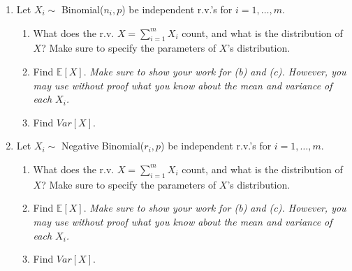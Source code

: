 \documentclass[12pt]{article}
\begin{document}
\begin{enumerate}
\item \label{SumBinom} Let $X_i\sim$ Binomial($n_i,p$) be independent r.v.'s for $i=1,\ldots,m$. 
	\begin{enumerate}
	\item What does the r.v. $X=\sum_{i=1}^mX_i$ count, and what is the distribution of $X$? Make sure to specify the parameters of $X$'s distribution.
	\item Find $\mathbb{E}[X]$. \emph{Make sure to show your work for (b) and (c). However, you may use without proof what you know about the mean and variance of each $X_i$.}
	\item Find $Var[X]$.
	\end{enumerate}





\item \label{SumNegBinom} Let $X_i\sim$ Negative Binomial($r_i,p$) be independent r.v.'s for $i=1,\ldots,m$. 
	\begin{enumerate}
	\item What does the r.v. $X=\sum_{i=1}^mX_i$ count, and what is the distribution of $X$? Make sure to specify the parameters of $X$'s distribution.
	\item Find $\mathbb{E}[X]$. \emph{Make sure to show your work for (b) and (c). However, you may use without proof what you know about the mean and variance of each $X_i$.}
	\item Find $Var[X]$.
	\end{enumerate}

\newpage


\end{enumerate}
\end{document}
